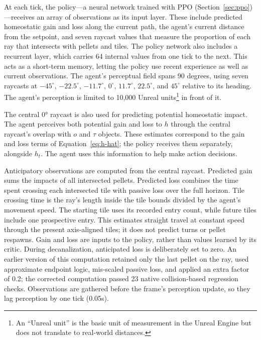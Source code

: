 \documentclass[12pt,fleqn]{article}
\begin{document}
At each tick, the policy---a neural network trained with PPO (Section~\ref{sec:ppo})---receives an array of observations as its input layer. These include predicted homeostatic gain and loss along the current path, the agent's current distance from the setpoint, and seven raycast values that measure the proportion of each ray that intersects with pellets and tiles. The policy network also includes a recurrent layer, which carries 64 internal values from one tick to the next. This acts as a short-term memory, letting the policy use recent experience as well as current observations. The agent's perceptual field spans 90 degrees, using seven raycasts at $-45^\circ$, $-22.5^\circ$, $-11.7^\circ$, $0^\circ$, $11.7^\circ$, $22.5^\circ$, and $45^\circ$ relative to its heading. The agent's perception is limited to 10,000 Unreal units\footnote{An ``Unreal unit'' is the basic unit of measurement in the Unreal Engine but does not translate to real-world distances.} in front of it.

The central 0° raycast is also used for predicting potential homeostatic impact. The agent perceives both potential gain and loss to \(h\) through the central raycast's  overlap with \(o\) and \(\tau\) objects. These estimates correspond to the gain and loss terms of Equation~\ref{eq:h-hat}; the policy receives them separately, alongside $h_t$. The agent uses this information to help make action decisions.

Anticipatory observations are computed from the central raycast. Predicted gain sums the impacts of all intersected pellets. Predicted loss combines the time spent crossing each intersected tile with passive loss over the full horizon. Tile crossing time is the ray's length inside the tile bounds divided by the agent's movement speed. The starting tile uses its recorded entry count, while future tiles include one prospective entry. This estimates straight travel at constant speed through the present axis-aligned tiles; it does not predict turns or pellet respawns. Gain and loss are inputs to the policy, rather than values learned by its critic. During decanalization, anticipated loss is deliberately set to zero. An earlier version of this computation retained only the last pellet on the ray, used approximate endpoint logic, mis-scaled passive loss, and applied an extra factor of 0.2; the corrected computation passed 23 native collision-based regression checks. Observations are gathered before the frame's perception update, so they lag perception by one tick (0.05s).
\end{document}
